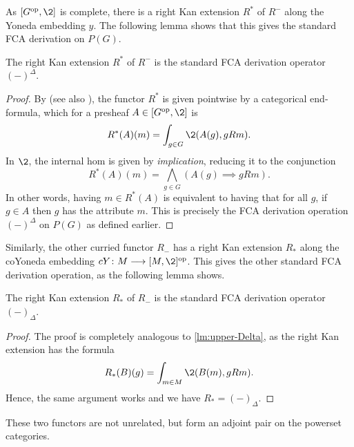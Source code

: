 As $[G\op, \2]$ is complete, there is a right Kan extension $R^*$ of $R^-$ along the Yoneda embedding $y$. The following lemma shows that this gives the standard FCA derivation on $P(G)$. 

\begin{lemma}
    \label{lm:upper-Delta}
    The right Kan extension $R^*$ of $R^-$ is the standard FCA derivation operator $(-)^\Delta$. 
\end{lemma}
\begin{proof}
    By \cite[Section X.4]{maclane_1998} (see also \cite[Section 4]{kelly_1982}), the functor $R^*$ is given pointwise by a categorical end-formula, which for a presheaf $A\in [G\op, \2]$ is
    \[R^*(A)(m) = \int_{g\in G} \2(A(g), gRm).\]
    In $\2$, the internal hom is given by \emph{implication}, reducing it to the conjunction 
    \[R^*(A)(m) = \bigwedge_{g\in G}(A(g) \implies gRm).\]
    In other words, having $m\in R^*(A)$ is equivalent to having that for all $g$, if $g\in A$ then $g$ has the attribute $m$. This is precisely the FCA derivation operation $(-)^\Delta$ on $P(G)$ as defined earlier. 
\end{proof}

Similarly, the other curried functor $R_{-}$ has a right Kan extension $R_*$ along the coYoneda embedding $cY\: M\to [M,\2]\op$. This gives the other standard FCA derivation operation, as the following lemma shows.  

\begin{lemma}
    \label{lm:lower-Delta}
    The right Kan extension $R_*$ of $R_-$ is the standard FCA derivation operator $(-)_\Delta$. 
\end{lemma}
\begin{proof}
    The proof is completely analogous to \cref{lm:upper-Delta}, as the right Kan extension has the formula
    \[R_*(B)(g)=\int_{m\in M}\2(B(m), gRm).\]
    Hence, the same argument works and we have $R_* = (-)_\Delta$.
\end{proof}

These two functors are not unrelated, but form an adjoint pair on the powerset categories. 

